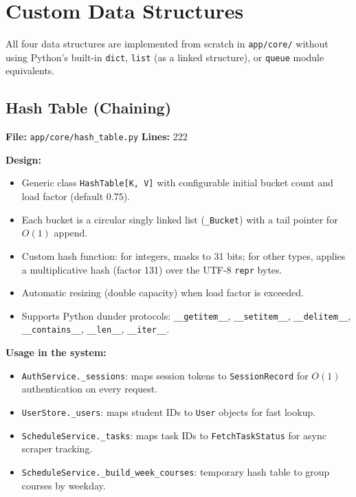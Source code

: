 \documentclass[12pt,a4paper]{article}
\begin{document}
\section{Custom Data Structures}
\label{sec:ds}

All four data structures are implemented from scratch in \texttt{app/core/} without using Python's built-in \texttt{dict}, \texttt{list} (as a linked structure), or \texttt{queue} module equivalents.

\subsection{Hash Table (Chaining)}

\textbf{File:} \texttt{app/core/hash\_table.py} \quad \textbf{Lines:} 222

\textbf{Design:}
\begin{itemize}[nosep]
    \item Generic class \texttt{HashTable[K, V]} with configurable initial bucket count and load factor (default 0.75).
    \item Each bucket is a circular singly linked list (\texttt{\_Bucket}) with a tail pointer for $O(1)$ append.
    \item Custom hash function: for integers, masks to 31 bits; for other types, applies a multiplicative hash (factor 131) over the UTF-8 \texttt{repr} bytes.
    \item Automatic resizing (double capacity) when load factor is exceeded.
    \item Supports Python dunder protocols: \texttt{\_\_getitem\_\_}, \texttt{\_\_setitem\_\_}, \texttt{\_\_delitem\_\_}, \texttt{\_\_contains\_\_}, \texttt{\_\_len\_\_}, \texttt{\_\_iter\_\_}.
\end{itemize}

\textbf{Usage in the system:}
\begin{itemize}[nosep]
    \item \texttt{AuthService.\_sessions}: maps session tokens to \texttt{SessionRecord} for $O(1)$ authentication on every request.
    \item \texttt{UserStore.\_users}: maps student IDs to \texttt{User} objects for fast lookup.
    \item \texttt{ScheduleService.\_tasks}: maps task IDs to \texttt{FetchTaskStatus} for async scraper tracking.
    \item \texttt{ScheduleService.\_build\_week\_courses}: temporary hash table to group courses by weekday.
\end{itemize}
\end{document}
